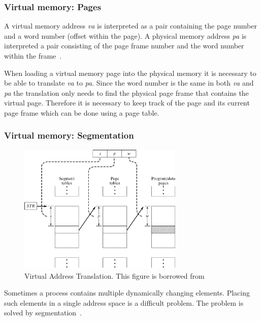 \subsubsection{Virtual memory: Pages}
A virtual memory address \textit{va} is interpreted as a pair  containing the page number and a word number (offset within the page).
A physical memory address \textit{pa} is interpreted a pair  consisting of the page frame number and the word number within the frame~\citep[Section~8.2.1]{OperatingSystemPrinciples}.

When loading a virtual memory page into the physical memory it is  necessary to be able to translate \textit{va} to \textit{pa}.
Since the word number is the same in both \textit{va} and \textit{pa} the translation only needs to find the physical page frame that contains the virtual page.
Therefore it is necessary to keep track of the page and its current page frame which can be done using a page table.

\subsubsection{Virtual memory: Segmentation}

\begin{figure}
\center\includegraphics[width=0.70\textwidth]{virtualAddressTranslation}
\caption{Virtual Address Translation. This figure is borrowed from~\citep[Figure~8-7]{OperatingSystemPrinciples}}
\label{fig:virtualAddressTranslation}
\end{figure}

Sometimes a process contains multiple dynamically changing elements. 
Placing such elements in a single address space is a difficult problem.
The problem is solved by segmentation~\citep[Section~8.2.2]{OperatingSystemPrinciples}.

